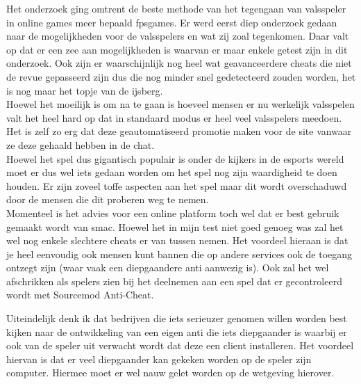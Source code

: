 \documentclass[pdftex,a4paper,12pt,twoside]{report}
\begin{document}
Het onderzoek ging omtrent de beste methode van het tegengaan van valsspeler in online games meer bepaald \gls{fpsgames}. Er werd eerst diep onderzoek gedaan naar de mogelijkheden voor de valsspelers en wat zij zoal tegenkomen. Daar valt op dat er een zee aan mogelijkheden is waarvan er maar enkele getest zijn in dit onderzoek. Ook zijn er waarschijnlijk nog heel wat geavanceerdere \gls{cheat}s die niet de revue gepasseerd zijn dus die nog minder snel gedetecteerd zouden worden, het is nog maar het topje van de ijsberg.
\\

Hoewel het moeilijk is om na te gaan is hoeveel mensen er nu werkelijk valsspelen valt het heel hard op dat in standaard modus er heel veel valsspelers meedoen. Het is zelf zo erg dat deze geautomatiseerd promotie maken voor de site vanwaar ze deze gehaald hebben in de chat.
\\

Hoewel het spel dus gigantisch populair is onder de kijkers in de \gls{esports} wereld moet er dus wel iets gedaan worden om het spel nog zijn waardigheid te doen houden. Er zijn zoveel toffe aspecten aan het spel maar dit wordt overschaduwd door de mensen die dit proberen weg te nemen.
\\

Momenteel is het advies voor een online platform toch wel dat er best gebruik gemaakt wordt van \gls{smac}. Hoewel het in mijn test niet goed genoeg was zal het wel nog enkele slechtere \gls{cheat}s er van tussen nemen. Het voordeel hieraan is dat je heel eenvoudig ook mensen kunt bannen die op andere services ook de toegang ontzegt zijn (waar vaak een diepgaandere \gls{anti} aanwezig is). Ook zal het wel afschrikken als spelers zien bij het deelnemen aan een spel dat er gecontroleerd wordt met Sourcemod Anti-Cheat. 

Uiteindelijk denk ik dat bedrijven die iets serieuzer genomen willen worden best kijken naar de ontwikkeling van een eigen \gls{anti} die iets diepgaander is waarbij er ook van de speler uit verwacht wordt dat deze een client installeren. Het voordeel hiervan is dat er veel diepgaander kan gekeken worden op de speler zijn computer. Hiermee moet er wel nauw gelet worden op de wetgeving hierover.





\listoffigures
\end{document}
